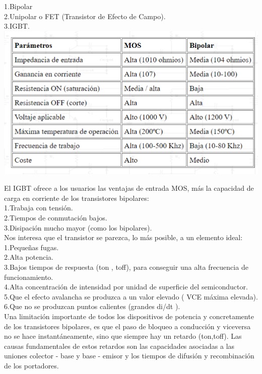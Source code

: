 \documentclass[10pt,a4paper]{article}
\begin{document}
1.Bipolar\\
2.Unipolar o FET (Transistor de Efecto de Campo).\\
3.IGBT.\\
\bigskip 
\centering
\includegraphics[scale=.70]{Parametros .png}\\
\raggedright
El IGBT ofrece a los usuarios las ventajas de entrada MOS, más la capacidad de carga en corriente de los transistores bipolares:\\
\bigskip
1.Trabaja con tensión.\\
2.Tiempos de conmutación bajos.\\
3.Disipación mucho mayor (como los bipolares).\\
\bigskip
Nos interesa que el transistor se parezca, lo más posible, a un elemento ideal:\\
\bigskip
1.Pequeñas fugas.\\
2.Alta potencia.\\
3.Bajos tiempos de respuesta (ton , toff), para conseguir una alta frecuencia de funcionamiento.\\
4.Alta concentración de intensidad por unidad de superficie del semiconductor.\\
5.Que el efecto avalancha se produzca a un valor elevado ( VCE máxima elevada).\\
6.Que no se produzcan puntos calientes (grandes di/dt ).\\
\bigskip
Una limitación importante de todos los dispositivos de potencia y concretamente de los transistores bipolares, es que el paso de bloqueo a conducción y viceversa no se hace instantáneamente, sino que siempre hay un retardo (ton,toff). Las causas fundamentales de estos retardos son las capacidades asociadas a las uniones colector - base y base - emisor y los tiempos de difusión y recombinación de los portadores.
\end{document}
